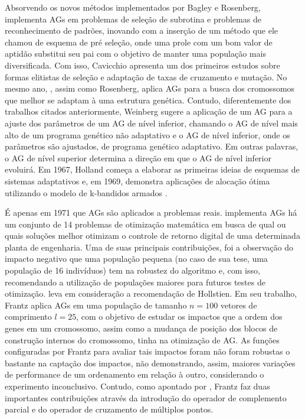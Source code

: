 Absorvendo os novos métodos implementados por Bagley e Rosenberg,  implementa AGs em problemas de seleção de subrotina e problemas de reconhecimento de padrões, inovando com a inserção de um método que ele chamou de esquema de pré seleção, onde uma prole com um bom valor de aptidão substitui seu pai com o objetivo de manter uma população mais diversificada. Com isso, Cavicchio apresenta um dos primeiros estudos sobre formas elitistas de seleção e adaptação de taxas de cruzamento e mutação. No mesmo ano, , assim como Rosenberg, aplica AGs para a busca dos cromossomos que melhor se adaptam à uma estrutura genética. Contudo, diferentemente dos trabalhos citados anteriormente, Weinberg sugere a aplicação de um AG para a ajuste dos parâmetros de um AG de nível inferior, chamando o AG de nível mais alto de um programa genético não adaptativo e o AG de nível inferior, onde os parâmetros são ajustados, de programa genético adaptativo. Em outras palavras, o AG de nível superior determina a direção em que o AG de nível inferior evoluirá. Em 1967, Holland começa a elaborar  as primeiras ideias de esquemas de sistemas adaptativos e, em 1969, demonstra aplicações de alocação ótima utilizando o modelo de k-bandidos armados .

É apenas em 1971 que AGs são aplicados a problemas reais.  implementa AGs há um conjunto de 14 problemas de otimização matemática em busca de qual ou quais soluções melhor otimizam o controle de retorno digital de uma determinada planta de engenharia. Uma de suas principais contribuições, foi a observação do impacto negativo que uma população pequena (no caso de sua tese, uma população de 16 indivíduos) tem na robustez do algoritmo e, com isso, recomendando a utilização de populações maiores para futuros testes de otimização.  leva em consideração a recomendação de Hollstien. Em seu trabalho, Frantz aplica AGs em uma população de tamanho $n = 100$ vetores de comprimento $l = 25$, com o objetivo de estudar os impactos que a ordem dos genes em um cromossomo, assim como a mudança de posição dos blocos de construção internos do cromossomo, tinha na otimização de AG. As funções configuradas por Frantz para avaliar tais impactos foram não foram robustas o bastante na captação dos impactos, não demonstrando, assim, maiores variações de performance de um ordenamento em relação à outro, considerando o experimento inconclusivo. Contudo, como apontado por , Frantz faz duas importantes contribuições através da introdução do operador de complemento parcial e do operador de cruzamento de múltiplos pontos.

